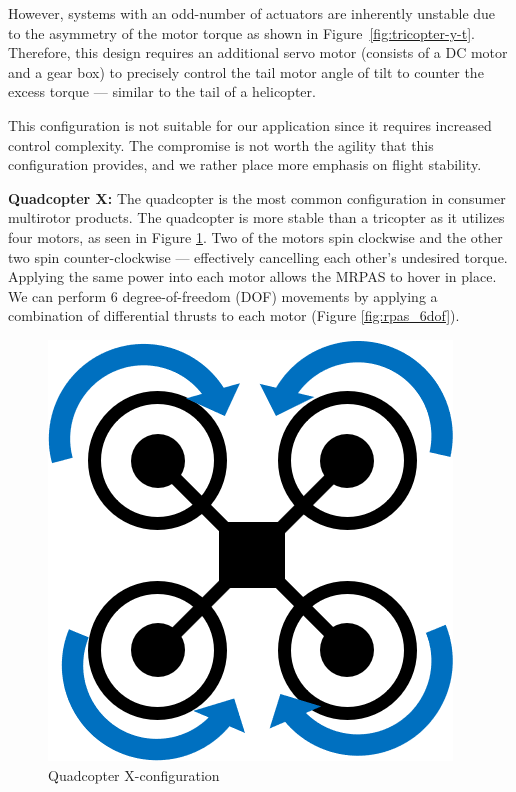 However, systems with an odd-number of actuators are inherently unstable due to the asymmetry of the motor torque as shown in Figure~\ref{fig:tricopter-y-t}. Therefore, this design requires an additional servo motor (consists of a DC motor and a gear box) to precisely control the tail motor angle of tilt to counter the excess torque --- similar to the tail of a helicopter.

This configuration is not suitable for our application since it requires increased control complexity. The compromise is not worth the agility that this configuration provides, and we rather place more emphasis on flight stability.

\textbf{Quadcopter X:}
The quadcopter is the most common configuration in consumer multirotor products. The quadcopter is more stable than a tricopter as it utilizes four motors, as seen in Figure \ref{fig:quadcopter-x-t}. Two of the motors spin clockwise and the other two spin counter-clockwise --- effectively cancelling each other’s undesired torque. Applying the same power into each motor allows the MRPAS to hover in place. We can perform 6 degree-of-freedom (DOF) movements by applying a combination of differential thrusts to each motor (Figure \ref{fig:rpas_6dof}).

\begin{figure}[h]
    \centering
    \includegraphics[scale=0.4]{img/drone_xconfigt}
    \caption{Quadcopter X-configuration}
    \label{fig:quadcopter-x-t}
\end{figure}

